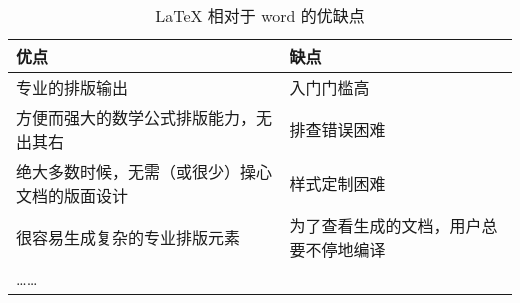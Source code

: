 \documentclass[timesfont,no-math]{JXUSTmodeling}%
\begin{document}
	\begin{table}[!htbp]
		\centering
		\caption{\LaTeX{} 相对于 word 的优缺点}\label{tab:feature}
		\begin{tabularx}{0.8\textwidth}{XX}
			\toprule
			优点				&		缺点			\\
			\midrule
			专业的排版输出		&	入门门槛高			\\
			\midrule
			方便而强大的数学公式排版能力，无出其右					&
			排查错误困难										\\
			\midrule
			绝大多数时候，无需（或很少）操心文档的版面设计				&
			样式定制困难								\\
			\midrule
			很容易生成复杂的专业排版元素						&
			为了查看生成的文档，用户总要不停地编译				\\
			\midrule
			\dots\dots			&							\\
			\bottomrule
		\end{tabularx}		
	\end{table}
\end{document}
